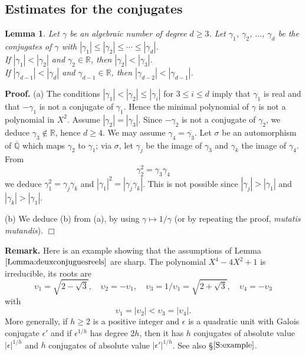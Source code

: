 \documentclass[leqno,11pt]{article}
\def\Q{\mathbb{Q}}
\def\R{\mathbb{R}}
\def\Qbar{\overline{\Q}}
\newtheorem{lemma}[theorem]{\indent  Lemma}
\begin{document}
\subsection{Estimates for the conjugates}\label{SS:Conjugates} 

\begin{lemma}\label{Lemma:deuxconjuguesreels}
Let $\gamma$ be an algebraic number of degree $d\ge 3$. Let 
$\gamma_1$,\linebreak 
$\gamma_2$, $\dots$, $\gamma_d$  be the conjugates of $\gamma$ with $ |\gamma_1|\le |\gamma_2|\le \cdots \le |\gamma_d|$. 
\\
 If $|\gamma_1|< |\gamma_2|$ and $\gamma_2\in\R$, then $|\gamma_2|<|\gamma_3|$. 
\\
 If $|\gamma_{d-1}|< |\gamma_d|$ and $\gamma_{d-1}\in\R$, then $|\gamma_{d-2}|<|\gamma_{d-1}|$. 
\end{lemma} 
{\bf Proof.}
(a) The conditions $|\gamma_1|< |\gamma_2|\le |\gamma_i|$ for $3\le i\le d$ imply that $\gamma_1$ is real and that $-\gamma_1$ is not a conjugate of $\gamma_1$. Hence the minimal polynomial of $\gamma$ is not a polynomial in $X^2$. Assume $|\gamma_2|=|\gamma_3|$. Since $-\gamma_2$ is not a conjugate of $\gamma_2$, we deduce $\gamma_3\not\in\R$, hence $d\ge 4$. We may assume $\gamma_4=\overline{\gamma_3}$. Let $\sigma$ be an automorphism of $\Qbar$ which maps $\gamma_2$ to $\gamma_1$; via $\sigma$, let $\gamma_j$ be the image of $\gamma_3$ and $\gamma_k$ the image of $\gamma_4$. From 
$$
\gamma_2^2=\gamma_3\gamma_4
$$
we deduce $
\gamma_1^2=\gamma_j\gamma_k
$
and
$
|\gamma_1|^2=|\gamma_j\gamma_k|$. 
This is not possible since $|\gamma_j|>|\gamma_1|$ and $|\gamma_k|>|\gamma_1|$. 

\indent (b) We deduce (b) from (a), by using $\gamma\mapsto 1/\gamma$ (or by repeating the proof, {\it mutatis mutandis}). 
\hfill $\Box$

 
{\bf Remark.} Here is an example showing that the assumptions of Lemma $\ref{Lemma:deuxconjuguesreels}$ are sharp. 
The polynomial $X^4-4X^2+1$ is irreducible, its roots are 
$$
\upsilon_1=\sqrt{2-\sqrt{3}},\quad \upsilon_2=-\upsilon_1,\quad \upsilon_3=1/\upsilon_1=\sqrt{2+\sqrt{3}},\quad \upsilon_4=-\upsilon_3
$$
with 
$$
\upsilon_1=|\upsilon_2|<\upsilon_3=|\upsilon_4|.
$$
More generally, if $h\geq 2$ is a positive integer and $\epsilon$ is a quadratic unit with Galois conjugate $\epsilon'$ and if $\epsilon^{1/h}$ has degree $2h$, then it has $h$ conjugates of absolute value $|\epsilon|^{1/h}$ and $h$ conjugates of absolute value $|\epsilon'|^{1/h}$.
See also \S$\ref{S:example}$. 
\end{document}
